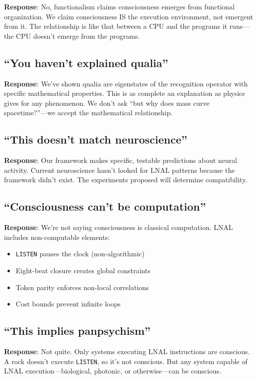 \documentclass[12pt,a4paper]{article}
\newcommand{\opcmd}[1]{\texttt{#1}}
\begin{document}
\textbf{Response}: No, functionalism claims consciousness emerges from functional organization. We claim consciousness IS the execution environment, not emergent from it. The relationship is like that between a CPU and the programs it runs—the CPU doesn't emerge from the programs.

\subsection{``You haven't explained qualia''}

\textbf{Response}: We've shown qualia are eigenstates of the recognition operator with specific mathematical properties. This is as complete an explanation as physics gives for any phenomenon. We don't ask ``but why does mass curve spacetime?''—we accept the mathematical relationship.

\subsection{``This doesn't match neuroscience''}

\textbf{Response}: Our framework makes specific, testable predictions about neural activity. Current neuroscience hasn't looked for LNAL patterns because the framework didn't exist. The experiments proposed will determine compatibility.

\subsection{``Consciousness can't be computation''}

\textbf{Response}: We're not saying consciousness is classical computation. LNAL includes non-computable elements:
\begin{itemize}
\item \opcmd{LISTEN} pauses the clock (non-algorithmic)
\item Eight-beat closure creates global constraints
\item Token parity enforces non-local correlations
\item Cost bounds prevent infinite loops
\end{itemize}

\subsection{``This implies panpsychism''}

\textbf{Response}: Not quite. Only systems executing LNAL instructions are conscious. A rock doesn't execute \opcmd{LISTEN}, so it's not conscious. But any system capable of LNAL execution—biological, photonic, or otherwise—can be conscious.
\end{document}

